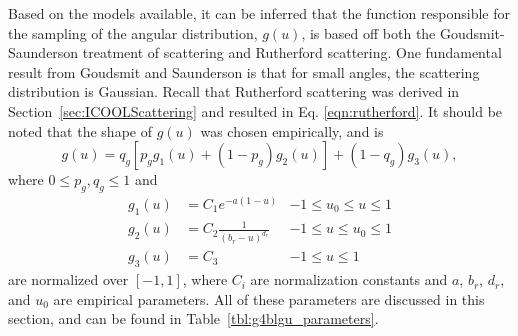 Based on the models available, it can be inferred that the function responsible for the sampling of the angular distribution, $g(u)$, is based off both the Goudsmit-Saunderson treatment of scattering \cite{gs} and Rutherford scattering. One fundamental result from Goudsmit and Saunderson is that for small angles, the scattering distribution is Gaussian. Recall that Rutherford scattering was derived in Section~\ref{sec:ICOOLScattering} and resulted in Eq. \eqref{eqn:rutherford}. It should be noted that the shape of $g(u)$ was chosen empirically, and is
%
\begin{equation}\label{eqn:g4blgu}
g(u)=q_g\left[p_g g_1(u)+(1-p_g)g_2(u)\right]+(1-q_g)g_3(u),
\end{equation}
%
where $0\leq p_g,q_g\leq 1$ and
%
\begin{align*}\nonumber
g_1(u)&=C_1e^{-a(1-u)} & -1\le u_0\le u\le 1\\
g_2(u)&=C_2\frac{1}{(b_r-u)^{d_r}} & -1\le u\le u_0\le 1\\
g_3(u)&=C_3 & -1\le u \le 1
\end{align*}
%
are normalized over $[-1,1]$, where $C_i$ are normalization constants and $a$, $b_r$, $d_r$, and $u_0$ are empirical parameters. All of these parameters are discussed in this section, and can be found in Table~\ref{tbl:g4blgu_parameters}. 

